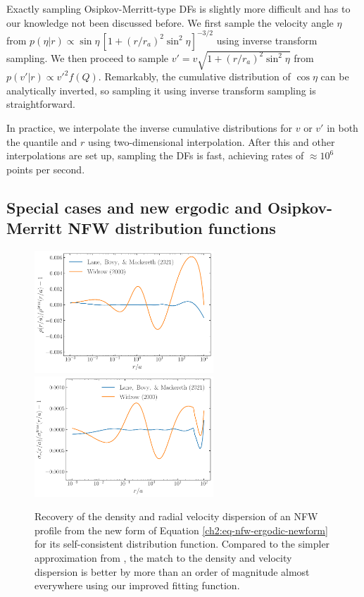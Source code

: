Exactly sampling Osipkov-Merritt-type DFs is slightly more difficult and has to our knowledge not been discussed before. We first sample the velocity angle $\eta$ from $p(\eta|r) \propto \sin\eta\,[1+(r/r_a)^2 \sin^2\eta]^{-3/2}$ using inverse transform sampling. We then proceed to sample $v'=v\sqrt{1+(r/r_a)^2\sin^2 \eta}$ from $p(v'|r)\propto v'^2 f(Q)$. Remarkably, the cumulative distribution of $\cos \eta$ can be analytically inverted, so sampling it using inverse transform sampling is straightforward.

In practice, we interpolate the inverse cumulative distributions for $v$ or $v'$ in both the quantile and $r$ using two-dimensional interpolation. After this and other interpolations are set up, sampling the DFs is fast, achieving rates of $\approx 10^6$ points per second.

\subsection{Special cases and new ergodic and Osipkov-Merritt NFW distribution functions}

\begin{figure}
	\centering
	\includegraphics[width=0.6\textwidth]{figure/ch2/ergodic_nfw_denscomp.pdf}\\
	\includegraphics[width=0.6\textwidth]{figure/ch2/ergodic_nfw_sigmacomp.pdf}
	\caption{Recovery of the density and radial velocity dispersion of an NFW profile from the new form of Equation \eqref{ch2:eq-nfw-ergodic-newform} for its self-consistent distribution function. Compared to the simpler approximation from \textcite{widrow00}, the match to the density and velocity dispersion is better by more than an order of magnitude almost everywhere using our improved fitting function.}
	\label{ch2:fig:ergodic_nfw}
\end{figure}

